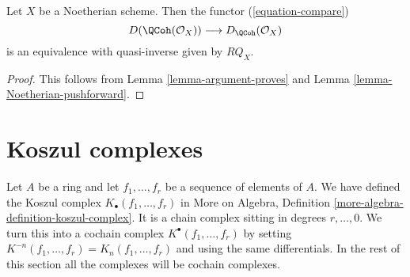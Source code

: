 \begin{proposition}
\label{proposition-Noetherian}
Let $X$ be a Noetherian scheme. Then the functor (\ref{equation-compare})
$$
D(\QCoh(\mathcal{O}_X))
\longrightarrow
D_\QCoh(\mathcal{O}_X)
$$
is an equivalence with quasi-inverse given by $RQ_X$.
\end{proposition}

\begin{proof}
This follows from Lemma \ref{lemma-argument-proves} and
Lemma \ref{lemma-Noetherian-pushforward}.
\end{proof}






\section{Koszul complexes}
\label{section-koszul}

\noindent
Let $A$ be a ring and let $f_1, \ldots, f_r$ be a sequence of elements
of $A$. We have defined the Koszul complex
$K_\bullet(f_1, \ldots, f_r)$ in
More on Algebra, Definition \ref{more-algebra-definition-koszul-complex}.
It is a chain complex sitting in degrees $r, \ldots, 0$.
We turn this into a cochain complex $K^\bullet(f_1, \ldots, f_r)$
by setting $K^{-n}(f_1, \ldots, f_r) = K_n(f_1, \ldots, f_r)$
and using the same differentials. In the rest of this section all
the complexes will be cochain complexes.

